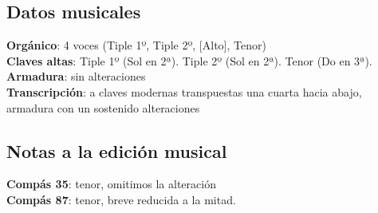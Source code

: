 \subsection*{Datos musicales}

\noindent \textbf{Orgánico}: 4 voces (Tiple 1º, Tiple 2º, [Alto], Tenor)\\
\textbf{Claves altas}: Tiple 1º (Sol en 2ª). Tiple 2º (Sol en 2ª). Tenor (Do en 3ª).\\
\textbf{Armadura}: sin alteraciones\\
\textbf{Transcripción}: a claves modernas transpuestas una cuarta hacia abajo, armadura con un sostenido alteraciones

\subsection*{Notas a la edición musical}

\noindent \textbf{Compás 35}: tenor, omitimos la alteración\\
\textbf{Compás 87}: tenor, breve reducida a la mitad.
